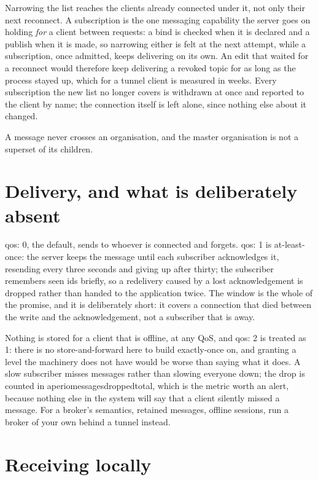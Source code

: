 \documentclass[11pt,a4paper,oneside]{book}
\newcommand{\aperiobreakableunderscore}{\textunderscore\allowbreak}
\newcommand{\aperiocodebreaks}{\XeTeXinterchartokenstate=1 }
\newcommand{\aperiocodebreaks}{}
\DeclareRobustCommand{\code}[1]{{\ttfamily\small\aperiocodebreaks
  \let\_\aperiobreakableunderscore#1}}
\begin{document}
Narrowing the list reaches the clients already connected under it, not
only their next reconnect. A subscription is the one messaging
capability the server goes on holding \emph{for} a client between
requests: a bind is checked when it is declared and a publish when it is
made, so narrowing either is felt at the next attempt, while a
subscription, once admitted, keeps delivering on its own. An edit that
waited for a reconnect would therefore keep delivering a revoked topic
for as long as the process stayed up, which for a tunnel client is
measured in weeks. Every subscription the new list no longer covers is
withdrawn at once and reported to the client by name; the connection
itself is left alone, since nothing else about it changed.

A message never crosses an organisation, and the master organisation is
not a superset of its children.

\section{Delivery, and what is deliberately absent}

\code{qos: 0}, the default, sends to whoever is connected and forgets.
\code{qos: 1} is at-least-once: the server keeps the message until each
subscriber acknowledges it, resending every three seconds and giving up
after thirty; the subscriber remembers seen ids briefly, so a
redelivery caused by a lost acknowledgement is dropped rather than
handed to the application twice. The window is the whole of the
promise, and it is deliberately short: it covers a connection that died
between the write and the acknowledgement, not a subscriber that is
away.

Nothing is stored for a client that is offline, at any QoS, and
\code{qos: 2} is treated as 1: there is no store-and-forward here to
build exactly-once on, and granting a level the machinery does not have
would be worse than saying what it does. A slow subscriber misses
messages rather than slowing everyone down; the drop is counted in
\code{aperio\_messages\_dropped\_total}, which is the metric worth an
alert, because nothing else in the system will say that a client
silently missed a message. For a broker's semantics, retained messages,
offline sessions, run a broker of your own behind a tunnel instead.

\section{Receiving locally}
\end{document}
